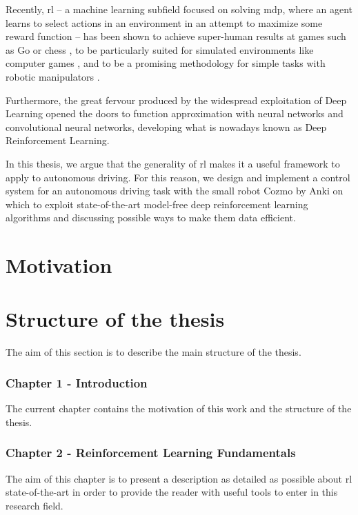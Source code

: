 Recently, \gls{rl} – a machine learning subfield focused on solving \gls{mdp}, where an agent learns to select actions in an environment in an attempt to maximize some reward function – has been shown to achieve super-human results at games such as Go \cite{silver2016mastering} or chess \cite{silver2017mastering}, to be particularly suited for simulated environments like computer games \cite{mnih2013playing}, and to be a promising methodology for simple tasks with robotic manipulators \cite{gu2017deep}.

Furthermore, the great fervour produced by the widespread exploitation of Deep Learning opened the doors to function approximation with neural networks and convolutional neural networks, developing what is nowadays known as Deep Reinforcement Learning.


In this thesis, we argue that the generality of \gls{rl} makes it a useful framework to apply to autonomous driving. 
For this reason, we design and implement a control system for an autonomous driving task with the small robot Cozmo by Anki \cite{cozmo2019SDK} on which to exploit state-of-the-art model-free deep reinforcement learning algorithms and discussing possible ways to make them data efficient.

\section{Motivation}

\section{Structure of the thesis}


The aim of this section is to describe the main structure of the thesis.

\subsubsection*{Chapter 1 - Introduction} The current chapter contains the motivation of this work and the structure of the thesis.

\subsubsection*{Chapter 2 - Reinforcement Learning Fundamentals}
The aim of this chapter is to present a description as detailed as possible about \gls{rl} state-of-the-art in order to provide the reader with useful tools to enter in this research field.
